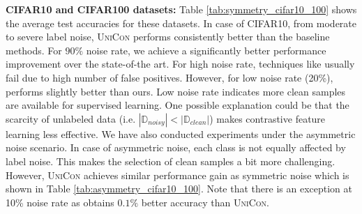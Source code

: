 \documentclass[10pt,twocolumn,letterpaper]{article}
\begin{document}
\textbf{CIFAR10 and CIFAR100 datasets:}  Table \ref{tab:symmetry_cifar10_100} shows the average test accuracies for these datasets. In case of CIFAR10, from moderate to severe label noise, \textsc{UniCon} performs consistently better than the baseline methods. 
For $90\%$ noise rate, we achieve a significantly better performance improvement over the state-of-the art. For high noise rate, techniques like \cite{li2020dividemix} usually fail due to high number of false positives. 
However, for low noise rate (20\%), \cite{li2020dividemix} performs slightly better than ours. Low noise rate indicates more clean samples are available for supervised learning. One possible explanation could be that the scarcity of unlabeled data (i.e. $|\mathbb{D}_{noisy}| < |\mathbb{D}_{clean}|$) makes contrastive feature learning less effective.  We have also conducted experiments under the asymmetric noise scenario. In case of asymmetric noise, each class is not equally affected by label noise. This makes the selection of clean samples a bit more challenging. However, \textsc{UniCon} achieves similar performance gain as symmetric noise which is shown in Table \ref{tab:asymmetry_cifar10_100}. Note that there is an exception at 10\% noise rate as \cite{liu2020earlylearning} obtains $0.1\%$ better accuracy than \textsc{UniCon}. 
\end{document}
